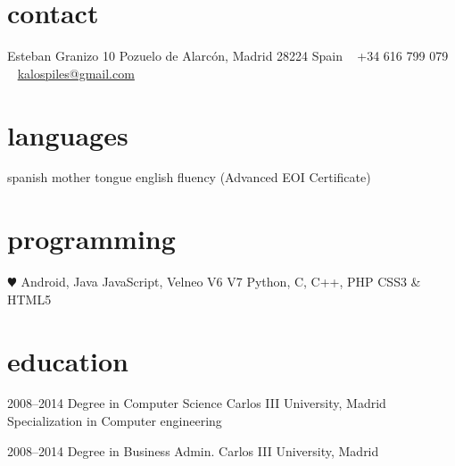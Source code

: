 \documentclass[]{friggeri-cv} %
\begin{document}


\begin{aside} %
\section{contact}
Esteban Granizo 10
Pozuelo de Alarcón, Madrid 28224
Spain
~
+34 616 799 079
~
\href{mailto:kalospiles@gmail.com}{kalospiles@gmail.com}
\section{languages}
spanish mother tongue
english fluency (Advanced EOI Certificate)
\section{programming}
{\color{red} $\varheartsuit$} Android, Java
JavaScript,
Velneo V6  V7
Python, C, C++, PHP
CSS3 \& HTML5
\end{aside}


\section{education}

\begin{entrylist}
\entry
{2008--2014}
{Degree {\normalfont in Computer Science}}
{Carlos III University, Madrid}
{Specialization in Computer engineering}

\entry
{2008--2014}
{Degree {\normalfont in Business Admin.}}
{Carlos III University, Madrid}

\end{entrylist}

\end{document}
